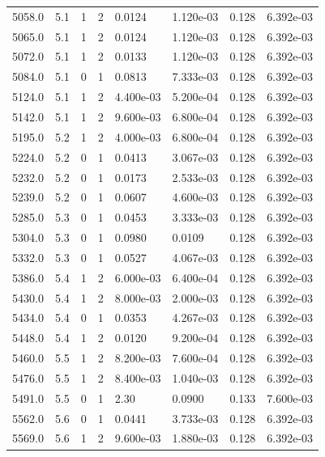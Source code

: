 \documentclass[preview]{standalone}
\begin{document}
{{{{{{{\begin{tabular}{L{1.2cm}C{1.2cm} C{0.3cm}C{0.5cm} C{1.4cm}C{1.4cm} C{1.4cm}C{1.4cm}}
  5058.0  &   5.1  & 1     &  2 &  0.0124  & 1.120e-03  & 0.128 &  6.392e-03   \\ 
  5065.0  &   5.1  & 1     &  2 &  0.0124  & 1.120e-03  & 0.128 &  6.392e-03   \\ 
  5072.0  &   5.1  & 1     &  2 &  0.0133  & 1.120e-03  & 0.128 &  6.392e-03   \\ 
  5084.0  &   5.1  & 0     &  1 &  0.0813  & 7.333e-03  & 0.128 &  6.392e-03   \\ 
  5124.0  &   5.1  & 1     &  2 &  4.400e-03  & 5.200e-04  & 0.128 &  6.392e-03   \\ 
  5142.0  &   5.1  & 1     &  2 &  9.600e-03  & 6.800e-04  & 0.128 &  6.392e-03   \\ 
  5195.0  &   5.2  & 1     &  2 &  4.000e-03  & 6.800e-04  & 0.128 &  6.392e-03   \\ 
  5224.0  &   5.2  & 0     &  1 &  0.0413  & 3.067e-03  & 0.128 &  6.392e-03   \\ 
  5232.0  &   5.2  & 0     &  1 &  0.0173  & 2.533e-03  & 0.128 &  6.392e-03   \\ 
  5239.0  &   5.2  & 0     &  1 &  0.0607  & 4.600e-03  & 0.128 &  6.392e-03   \\ 
  5285.0  &   5.3  & 0     &  1 &  0.0453  & 3.333e-03  & 0.128 &  6.392e-03   \\ 
  5304.0  &   5.3  & 0     &  1 &  0.0980  & 0.0109  & 0.128 &  6.392e-03   \\ 
  5332.0  &   5.3  & 0     &  1 &  0.0527  & 4.067e-03  & 0.128 &  6.392e-03   \\ 
  5386.0  &   5.4  & 1     &  2 &  6.000e-03  & 6.400e-04  & 0.128 &  6.392e-03   \\ 
  5430.0  &   5.4  & 1     &  2 &  8.000e-03  & 2.000e-03  & 0.128 &  6.392e-03   \\ 
  5434.0  &   5.4  & 0     &  1 &  0.0353  & 4.267e-03  & 0.128 &  6.392e-03   \\ 
  5448.0  &   5.4  & 1     &  2 &  0.0120  & 9.200e-04  & 0.128 &  6.392e-03   \\ 
  5460.0  &   5.5  & 1     &  2 &  8.200e-03  & 7.600e-04  & 0.128 &  6.392e-03   \\ 
  5476.0  &   5.5  & 1     &  2 &  8.400e-03  & 1.040e-03  & 0.128 &  6.392e-03   \\ 
  5491.0  &   5.5  & 0     &  1 &  2.30  & 0.0900  & 0.133 &  7.600e-03   \\ 
  5562.0  &   5.6  & 0     &  1 &  0.0441  & 3.733e-03  & 0.128 &  6.392e-03   \\ 
  5569.0  &   5.6  & 1     &  2 &  9.600e-03  & 1.880e-03  & 0.128 &  6.392e-03   \\ 

\end{tabular}}}}}}}}
\end{document}

